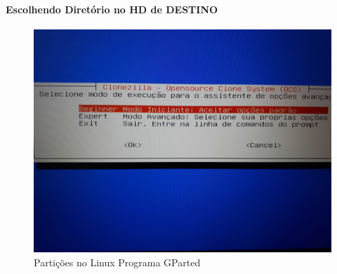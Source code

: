 \documentclass{beamer}
\begin{document}
\begin{frame}[plain,c]
   \frametitle{\insertsection}
    \framesubtitle{Escolhendo Diretório no HD de DESTINO}
    \begin{figure}[!h]
        \includegraphics[width=1\linewidth]{images/backup/bkp13.jpg}
        \caption{Partições no Linux Programa GParted}
    \end{figure}
\end{frame}
\end{document}
